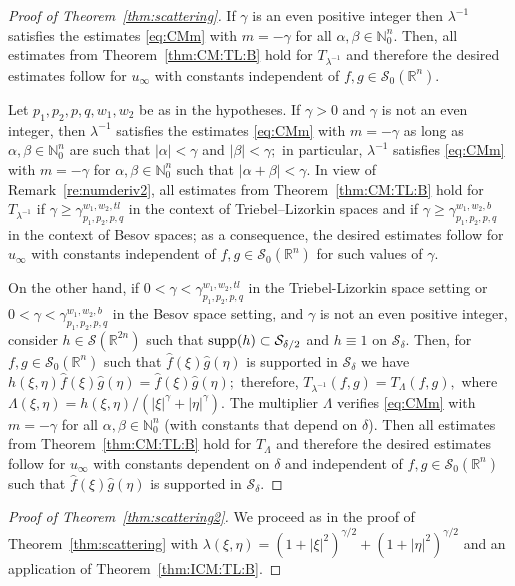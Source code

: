 \documentclass[10pt,a4paper]{article}
\theoremstyle{remark}
\newcommand{\na}{\mathbb{N}}
\newcommand{\re}{\mathbb{R}}
\newcommand{\rn}{{{\mathbb R}^n}}
\newcommand{\swz}{{\mathcal{S}_0}(\rn)}
\newcommand{\Ss}{\mathcal{S}}
\newcommand{\fhat}{\widehat{f}}
\newcommand{\ghat}{\widehat{g}}
\newcommand{\abs}[1]{\left\vert #1 \right\vert}
\newcommand{\supp}{{\rm{supp}}}
\newcommand{\gamt}{\gamma_{p_1,p_2,p,q}^{w_1,w_2, tl}}
\newcommand{\gamb}{\gamma_{p_1,p_2,p,q}^{w_1,w_2,b}}
\begin{document}
\begin{proof}[Proof of Theorem~\ref{thm:scattering}]
If $\gamma$ is an even positive integer then $\lambda^{-1}$ satisfies the estimates \eqref{eq:CMm} with $m=-\gamma$ for all $\alpha,\beta\in\na_0^n.$ Then,  all estimates from Theorem~\ref{thm:CM:TL:B} hold for $T_{\lambda^{-1}}$  and therefore the desired estimates follow for $u_\infty$ with constants independent of $f,g\in\swz.$ 

Let $p_1,p_2,p,q, w_1,w_2$ be as in the hypotheses.  If $\gamma>0$ and $\gamma$ is not an even integer, then $\lambda^{-1}$ satisfies the estimates \eqref{eq:CMm} with $m=-\gamma$ as long as  $\alpha,\beta\in\na_0^n$ are such that $\abs{\alpha}<\gamma$ and $\abs{\beta}<\gamma;$ in particular, $\lambda^{-1}$ satisfies \eqref{eq:CMm} with $m=-\gamma$ for $\alpha,\beta\in \na_0^n$ such that $\abs{\alpha+\beta}<\gamma.$
In view of Remark~\ref{re:numderiv2}, all estimates from Theorem~\ref{thm:CM:TL:B} hold for $T_{\lambda^{-1}}$ if $\gamma\ge \gamt$ in the context of Triebel--Lizorkin spaces and if $\gamma\ge \gamb$ in the context of Besov spaces; as a consequence, the desired estimates follow for $u_\infty$ with constants independent of $f,g\in\swz$ for such values of $\gamma.$


On the other hand, if $0<\gamma<\gamt$ in the Triebel-Lizorkin space setting or $0<\gamma<\gamb$ in the Besov space setting, and $\gamma$ is not an even positive integer, consider  $h\in\Ss(\re^{2n}) $ such that $\supp(h)\subset \Ss_{\delta/2}$ and $h\equiv 1$ on $\Ss_{\delta}.$ Then, for $f,g\in \swz$ such that $\fhat(\xi)\ghat(\eta)$ is supported in $\Ss_{\delta}$ we have $h(\xi,\eta)\fhat(\xi)\ghat(\eta)=\fhat(\xi)\ghat(\eta);$   therefore, $T_{\lambda^{-1}}(f,g)=T_{\Lambda}(f,g),$ where
$\Lambda(\xi,\eta)=h(\xi,\eta)/(\abs{\xi}^\gamma+\abs{\eta}^\gamma).$ The multiplier $\Lambda$ verifies  \eqref{eq:CMm} with $m=-\gamma$  for all $\alpha,\beta\in\na_0^n$ (with constants that depend on $\delta$). Then all estimates from Theorem~\ref{thm:CM:TL:B} hold for $T_\Lambda$ and therefore the desired estimates follow for $u_\infty$ with constants dependent on $\delta$ and independent of $f,g\in\swz$ such that  $\fhat(\xi)\ghat(\eta)$ is supported in $\Ss_{\delta}.$
\end{proof}

\begin{proof}[Proof of Theorem~\ref{thm:scattering2}] We proceed as in the proof of Theorem~\ref{thm:scattering} with $\lambda(\xi,\eta)=(1+\abs{\xi}^2)^{\gamma /2}+(1+\abs{\eta}^2)^{\gamma /2}$ and an application of  Theorem~\ref{thm:ICM:TL:B}.  
\end{proof}
\end{document}
